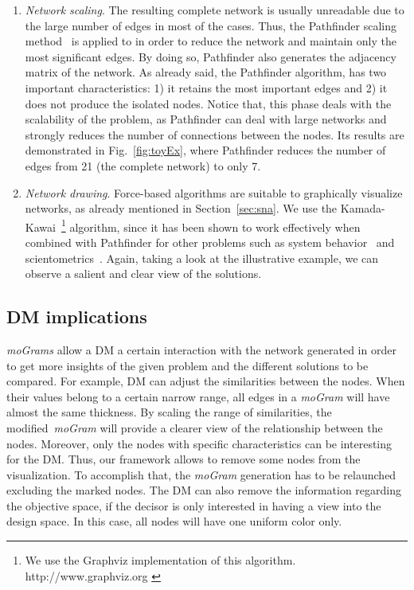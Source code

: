 \documentclass[journal]{IEEEtran}
\begin{document}
\begin{enumerate}
 \item \emph{Network scaling}. The resulting complete network is usually unreadable due to the large number of edges in most of the cases. Thus, the Pathfinder scaling method~\cite{Dearholt90,Sch89} is applied to  in order to reduce the network and maintain only the most significant edges. 
By doing so, Pathfinder also generates the adjacency matrix  of the network. As already said, the Pathfinder algorithm, has two important characteristics: 1) it retains the most important edges and 2) it does not produce the isolated nodes. Notice that, this phase deals with the scalability of the problem, as Pathfinder can deal with large networks and strongly reduces the number of connections between the nodes. Its results are demonstrated in Fig.~\ref{fig:toyEx}, where Pathfinder reduces the number of edges from 21 (the complete network) to only 7. 

 \item \emph{Network drawing}. Force-based algorithms are suitable to graphically visualize networks, as already mentioned in Section~\ref{sec:sna}. We use the Kamada-Kawai~\footnote{We use the Graphviz implementation of this algorithm. http://www.graphviz.org \cite{Graphviz1999}} algorithm, since it has been shown to work effectively when combined with Pathfinder for other problems such as system behavior~\cite{PanchoIEEETFS2013} and scientometrics~\cite{MoyaAnegon07}. Again, taking a look at the illustrative example, we can observe a salient and clear view of the solutions.

\end{enumerate}


\subsection{DM implications}
\label{sec:dmimplic}


\emph{moGrams} allow a DM a certain interaction with the network generated in order to get more insights of the given problem and the different solutions to be compared. For example, DM can adjust the similarities between the nodes. When their values belong to a certain narrow range, all edges in a \emph{moGram} will have almost the same thickness. By scaling the range of similarities, the modified~\emph{moGram} will provide a clearer view of the relationship between the nodes. Moreover, only the nodes with specific characteristics can be interesting for the DM. Thus, our framework allows to remove some nodes from the visualization. To accomplish that, the \emph{moGram} generation has to be relaunched excluding the marked nodes. The DM can also remove the information regarding the objective space, if the decisor is only interested in having a view into the design space. In this case, all nodes will have one uniform color only.
\end{document}

